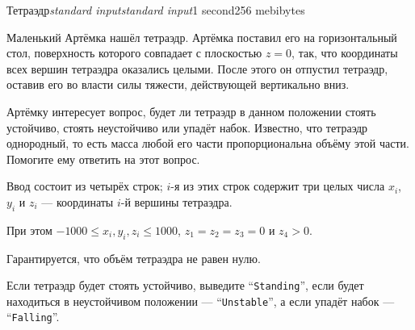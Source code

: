 \begin{problem}{Тетраэдр}{\textsl{standard input}}{\textsl{standard input}}{1 second}{256 mebibytes}{}

Маленький Артёмка нашёл тетраэдр.
Артёмка поставил его на горизонтальный стол, поверхность которого совпадает с плоскостью $z = 0$, так, что координаты всех вершин тетраэдра оказались целыми.
После этого он отпустил тетраэдр, оставив его во власти силы тяжести, действующей вертикально вниз.

Артёмку интересует вопрос, будет ли тетраэдр в данном положении стоять устойчиво, стоять неустойчиво или упадёт набок.
Известно, что тетраэдр однородный, то есть масса любой его части пропорциональна объёму этой части.
Помогите ему ответить на этот вопрос.


\InputFile
Ввод состоит из четырёх строк; $i$-я из этих строк содержит три целых числа
$x_i$, $y_i$ и $z_i$ --- координаты $i$-й вершины тетраэдра.

При этом $-1000 \le x_i, y_i, z_i \le 1000$, $z_1 = z_2 = z_3 = 0$ и $z_4 > 0$. 

Гарантируется, что объём тетраэдра не равен нулю.


\OutputFile
Если тетраэдр будет стоять устойчиво, выведите ``\texttt{Standing}'',
если будет находиться в неустойчивом положении --- ``\texttt{Unstable}'',
а если упадёт набок --- ``\texttt{Falling}''.

\Examples

\begin{example}
%
%
%
\end{example}

\end{problem}
